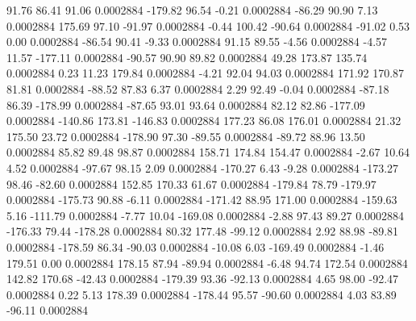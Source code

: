        91.76       86.41       91.06     0.0002884
     -179.82       96.54       -0.21     0.0002884
      -86.29       90.90        7.13     0.0002884
      175.69       97.10      -91.97     0.0002884
       -0.44      100.42      -90.64     0.0002884
      -91.02        0.53        0.00     0.0002884
      -86.54       90.41       -9.33     0.0002884
       91.15       89.55       -4.56     0.0002884
       -4.57       11.57     -177.11     0.0002884
      -90.57       90.90       89.82     0.0002884
       49.28      173.87      135.74     0.0002884
        0.23       11.23      179.84     0.0002884
       -4.21       92.04       94.03     0.0002884
      171.92      170.87       81.81     0.0002884
      -88.52       87.83        6.37     0.0002884
        2.29       92.49       -0.04     0.0002884
      -87.18       86.39     -178.99     0.0002884
      -87.65       93.01       93.64     0.0002884
       82.12       82.86     -177.09     0.0002884
     -140.86      173.81     -146.83     0.0002884
      177.23       86.08      176.01     0.0002884
       21.32      175.50       23.72     0.0002884
     -178.90       97.30      -89.55     0.0002884
      -89.72       88.96       13.50     0.0002884
       85.82       89.48       98.87     0.0002884
      158.71      174.84      154.47     0.0002884
       -2.67       10.64        4.52     0.0002884
      -97.67       98.15        2.09     0.0002884
     -170.27        6.43       -9.28     0.0002884
     -173.27       98.46      -82.60     0.0002884
      152.85      170.33       61.67     0.0002884
     -179.84       78.79     -179.97     0.0002884
     -175.73       90.88       -6.11     0.0002884
     -171.42       88.95      171.00     0.0002884
     -159.63        5.16     -111.79     0.0002884
       -7.77       10.04     -169.08     0.0002884
       -2.88       97.43       89.27     0.0002884
     -176.33       79.44     -178.28     0.0002884
       80.32      177.48      -99.12     0.0002884
        2.92       88.98      -89.81     0.0002884
     -178.59       86.34      -90.03     0.0002884
      -10.08        6.03     -169.49     0.0002884
       -1.46      179.51        0.00     0.0002884
      178.15       87.94      -89.94     0.0002884
       -6.48       94.74      172.54     0.0002884
      142.82      170.68      -42.43     0.0002884
     -179.39       93.36      -92.13     0.0002884
        4.65       98.00      -92.47     0.0002884
        0.22        5.13      178.39     0.0002884
     -178.44       95.57      -90.60     0.0002884
        4.03       83.89      -96.11     0.0002884
